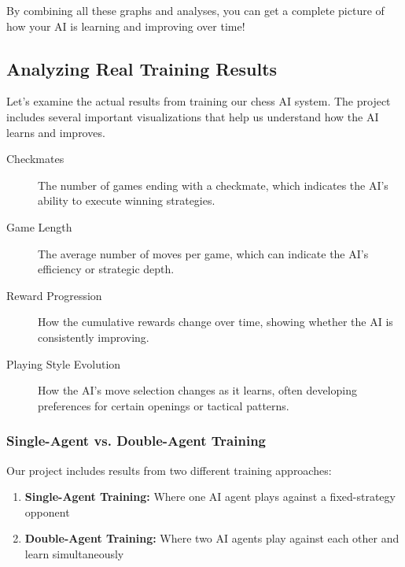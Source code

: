 \documentclass[11pt]{article}
\newenvironment{termbox}[1]
  {\begin{tcolorbox}[colback=blue!5!white,colframe=blue!75!black,title=#1,fonttitle=\bfseries]}
  {\end{tcolorbox}}
\begin{document}
By combining all these graphs and analyses, you can get a complete picture of how your AI is learning and improving over time!

\subsection{Analyzing Real Training Results}

Let's examine the actual results from training our chess AI system. The project includes several important visualizations that help us understand how the AI learns and improves.

\begin{termbox}{Key Metrics in Chess AI Training Results}
\begin{description}
    \item[Checkmates] The number of games ending with a checkmate, which indicates the AI's ability to execute winning strategies.
    
    \item[Game Length] The average number of moves per game, which can indicate the AI's efficiency or strategic depth.
    
    \item[Reward Progression] How the cumulative rewards change over time, showing whether the AI is consistently improving.
    
    \item[Playing Style Evolution] How the AI's move selection changes as it learns, often developing preferences for certain openings or tactical patterns.
\end{description}
\end{termbox}

\subsubsection{Single-Agent vs. Double-Agent Training}

Our project includes results from two different training approaches:

\begin{enumerate}
    \item \textbf{Single-Agent Training:} Where one AI agent plays against a fixed-strategy opponent
    \item \textbf{Double-Agent Training:} Where two AI agents play against each other and learn simultaneously
\end{enumerate}
\end{document}
